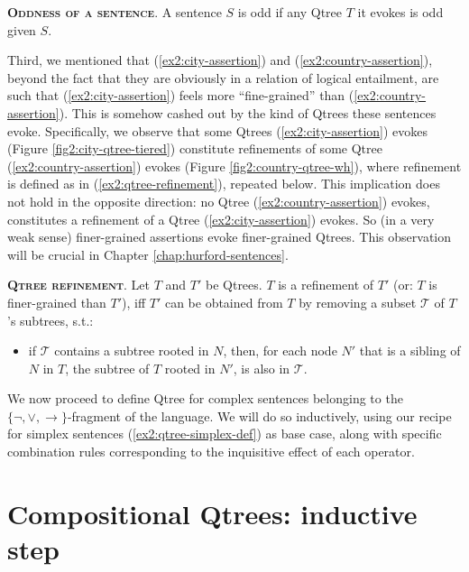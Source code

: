 \begin{exe}
	 {\textsc{\textbf{Oddness of a sentence}}. A sentence $S$ is odd if any Qtree $T$ it evokes is odd given $S$.}
\end{exe}


Third, we mentioned that (\ref{ex2:city-assertion}) and (\ref{ex2:country-assertion}), beyond the fact that they are obviously in a relation of logical entailment, are such that (\ref{ex2:city-assertion}) feels more ``fine-grained'' than (\ref{ex2:country-assertion}). This is somehow cashed out by the kind of Qtrees these sentences evoke. Specifically, we observe that some Qtrees (\ref{ex2:city-assertion}) evokes (Figure \ref{fig2:city-qtree-tiered}) constitute refinements of some Qtree (\ref{ex2:country-assertion}) evokes (Figure \ref{fig2:country-qtree-wh}), where refinement is defined as in (\ref{ex2:qtree-refinement}), repeated below. This implication does not hold in the opposite direction: no Qtree (\ref{ex2:country-assertion}) evokes, constitutes a refinement of a Qtree (\ref{ex2:city-assertion}) evokes. So (in a very weak sense) finer-grained assertions evoke finer-grained Qtrees. This observation will be crucial in Chapter \ref{chap:hurford-sentences}.

\begin{exe}
	 {\textsc{\textbf{Qtree refinement}}. Let $T$ and $T'$ be Qtrees. $T$ is a refinement of $T'$ (or: $T$ is finer-grained than $T'$), iff $T'$ can be obtained from $T$ by removing a subset $\mathcal{T}$ of $T$'s subtrees, s.t.:
		\begin{itemize}
			\item if $\mathcal{T}$ contains a subtree rooted in $N$, then, for each node $N'$ that is a sibling of $N$ in $T$, the subtree of $T$ rooted in $N'$, is also in $\mathcal{T}$.
	\end{itemize}}
\end{exe}

We now proceed to define Qtree for complex sentences belonging to the $\lbrace \neg, \vee, \rightarrow\rbrace$-fragment of the language. We will do so inductively, using our recipe for simplex sentences (\ref{ex2:qtree-simplex-def}) as base case, along with specific combination rules corresponding to the inquisitive effect of each operator.


\section{Compositional Qtrees: inductive step}

